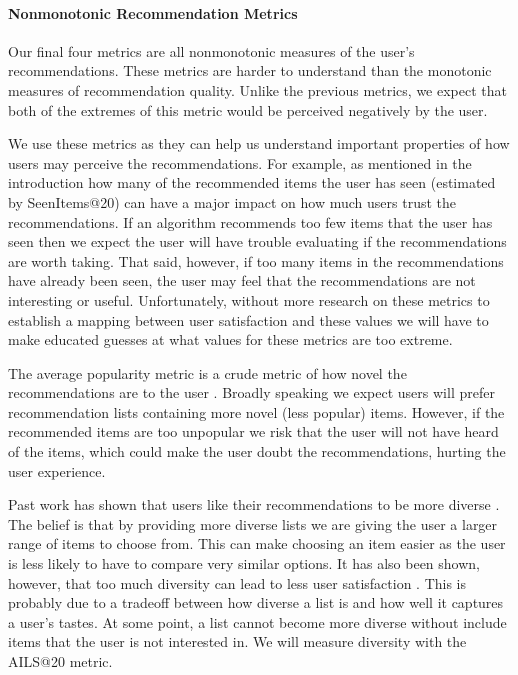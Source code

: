 \documentclass[letterpaper]{sig-alternate}
\begin{document}
  \paragraph{Nonmonotonic Recommendation Metrics}
  Our final four metrics are all nonmonotonic measures of the user's recommendations.
  These metrics are harder to understand than the monotonic measures of recommendation quality.
  Unlike the previous metrics, we expect that both of the extremes of this metric would be perceived negatively by the user.

  We use these metrics as they can help us understand important properties of how users may perceive the recommendations.
  For example, as mentioned in the introduction how many of the recommended items the user has seen (estimated by SeenItems@20) can have a major impact on how much users trust the recommendations.
  If an algorithm recommends too few items that the user has seen then we expect the user will have trouble evaluating if the recommendations are worth taking.
  That said, however, if too many items in the recommendations have already been seen, the user may feel that the recommendations are not interesting or useful.
  Unfortunately, without more research on these metrics to establish a mapping between user satisfaction and these values we will have to make educated guesses at what values for these metrics are too extreme.

  The average popularity metric is a crude metric of how novel the recommendations are to the user \cite{zieglerDiversity}.
  Broadly speaking we expect users will prefer recommendation lists containing more novel (less popular) items.
  However, if the recommended items are too unpopular we risk that the user will not have heard of the items, which could make the user doubt the recommendations, hurting the user experience.

  Past work has shown that users like their recommendations to be more diverse \cite{zieglerDiversity, martijnDiversity}.
  The belief is that by providing more diverse lists we are giving the user a larger range of items to choose from.
  This can make choosing an item easier as the user is less likely to have to compare very similar options.
  It has also been shown, however, that too much diversity can lead to less user satisfaction \cite{zieglerDiversity}.
  This is probably due to a tradeoff between how diverse a list is and how well it captures a user's tastes.
  At some point, a list cannot become more diverse without include items that the user is not interested in.
  We will measure diversity with the AILS@20 metric.
\end{document}
